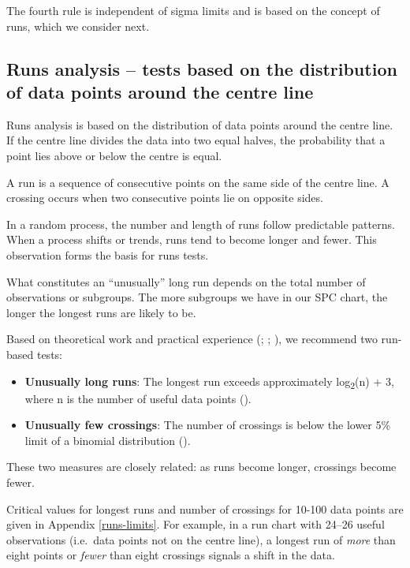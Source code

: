 \documentclass[
]{book}
\begin{document}
The fourth rule is independent of sigma limits and is based on the concept of runs, which we consider next.

\subsection{Runs analysis -- tests based on the distribution of data points around the centre line}\label{runs-analysis-tests-based-on-the-distribution-of-data-points-around-the-centre-line}

Runs analysis is based on the distribution of data points around the centre line. If the centre line divides the data into two equal halves, the probability that a point lies above or below the centre is equal.

A run is a sequence of consecutive points on the same side of the centre line. A crossing occurs when two consecutive points lie on opposite sides.

In a random process, the number and length of runs follow predictable patterns. When a process shifts or trends, runs tend to become longer and fewer. This observation forms the basis for runs tests.

What constitutes an ``unusually'' long run depends on the total number of observations or subgroups. The more subgroups we have in our SPC chart, the longer the longest runs are likely to be.

Based on theoretical work and practical experience (; ; ), we recommend two run-based tests:

\begin{itemize}
\item
  \textbf{Unusually long runs}: The longest run exceeds approximately log\textsubscript{2}(n) + 3, where n is the number of useful data points ().
\item
  \textbf{Unusually few crossings}: The number of crossings is below the lower 5\% limit of a binomial distribution ().
\end{itemize}

These two measures are closely related: as runs become longer, crossings become fewer.

Critical values for longest runs and number of crossings for 10-100 data points are given in Appendix \ref{runs-limits}. For example, in a run chart with 24--26 useful observations (i.e.~data points not on the centre line), a longest run of \emph{more} than eight points or \emph{fewer} than eight crossings signals a shift in the data.
\end{document}
